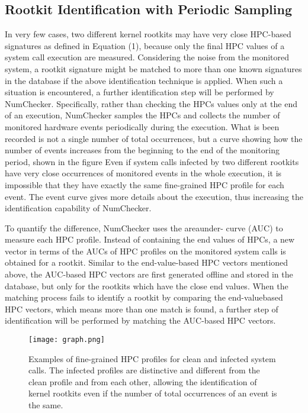 \documentclass[12pt]{report}
\begin{document}
\subsection{Rootkit Identification with Periodic Sampling}
In very
few cases, two different kernel rootkits may have very close
HPC-based signatures as defined in Equation (1), because only
the final HPC values of a system call execution are measured.
Considering the noise from the monitored system, a rootkit
signature might be matched to more than one known signatures
in the database if the above identification technique is applied.
When such a situation is encountered, a further identification
step will be performed by NumChecker. Specifically, rather
than checking the HPCs values only at the end of an execution,
NumChecker samples the HPCs and collects the number of
monitored hardware events periodically during the execution.
What is been recorded is not a single number of total occurrences,
but a curve showing how the number of events
increases from the beginning to the end of the monitoring
period, shown in the figure Even if system calls infected by
two different rootkits have very close occurrences of monitored
events in the whole execution, it is impossible that they have
exactly the same fine-grained HPC profile for each event.
The event curve gives more details about the execution, thus
increasing the identification capability of NumChecker.

To quantify the difference, NumChecker uses the areaunder-
curve (AUC) to measure each HPC profile. Instead of
containing the end values of HPCs, a new vector in terms
of the AUCs of HPC profiles on the monitored system calls
is obtained for a rootkit. Similar to the end-value-based HPC
vectors mentioned above, the AUC-based HPC vectors are first
generated offline and stored in the database, but only for the
rootkits which have the close end values. When the matching
process fails to identify a rootkit by comparing the end-valuebased
HPC vectors, which means more than one match is
found, a further step of identification will be performed by
matching the AUC-based HPC vectors.

\begin{figure}[h]
\centering
\texttt{[image: graph.png]}
\caption{Examples of fine-grained HPC profiles for clean and infected
system calls. The infected profiles are distinctive and different from
the clean profile and from each other, allowing the identification of
kernel rootkits even if the number of total occurrences of an event is
the same.}
\end{figure}
\end{document}

